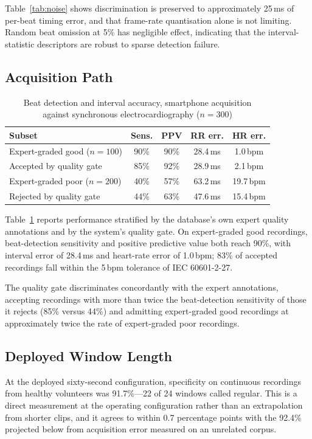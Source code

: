 \documentclass[conference]{IEEEtran}
\begin{document}
Table~\ref{tab:noise} shows discrimination is preserved to approximately 25\,ms of
per-beat timing error, and that frame-rate quantisation alone is not limiting.
Random beat omission at 5\% has negligible effect, indicating that the
interval-statistic descriptors are robust to sparse detection failure.

\subsection{Acquisition Path}

\begin{table}[t]
\caption{Beat detection and interval accuracy, smartphone acquisition\\
against synchronous electrocardiography ($n = 300$)}
\label{tab:butppg}
\centering
\footnotesize
\begin{tabular}{lcccc}
\toprule
Subset & Sens. & PPV & RR err. & HR err. \\
\midrule
Expert-graded good ($n{=}100$) & 90\% & 90\% & 28.4\,ms & 1.0\,bpm \\
Accepted by quality gate       & 85\% & 92\% & 28.9\,ms & 2.1\,bpm \\
Expert-graded poor ($n{=}200$) & 40\% & 57\% & 63.2\,ms & 19.7\,bpm \\
Rejected by quality gate       & 44\% & 63\% & 47.6\,ms & 15.4\,bpm \\
\bottomrule
\end{tabular}
\end{table}

Table~\ref{tab:butppg} reports performance stratified by the database's own expert
quality annotations and by the system's quality gate. On expert-graded good
recordings, beat-detection sensitivity and positive predictive value both reach
90\%, with interval error of 28.4\,ms and heart-rate error of 1.0\,bpm; 83\% of
accepted recordings fall within the 5\,bpm tolerance of IEC 60601-2-27.

The quality gate discriminates concordantly with the expert annotations,
accepting recordings with more than twice the beat-detection sensitivity of those
it rejects (85\% versus 44\%) and admitting expert-graded good recordings at
approximately twice the rate of expert-graded poor recordings.

\subsection{Deployed Window Length}
At the deployed sixty-second configuration, specificity on continuous recordings from
healthy volunteers was 91.7\%---22 of 24 windows called regular. This is a direct
measurement at the operating configuration rather than an extrapolation from shorter
clips, and it agrees to within 0.7 percentage points with the 92.4\% projected below
from acquisition error measured on an unrelated corpus.
\end{document}
